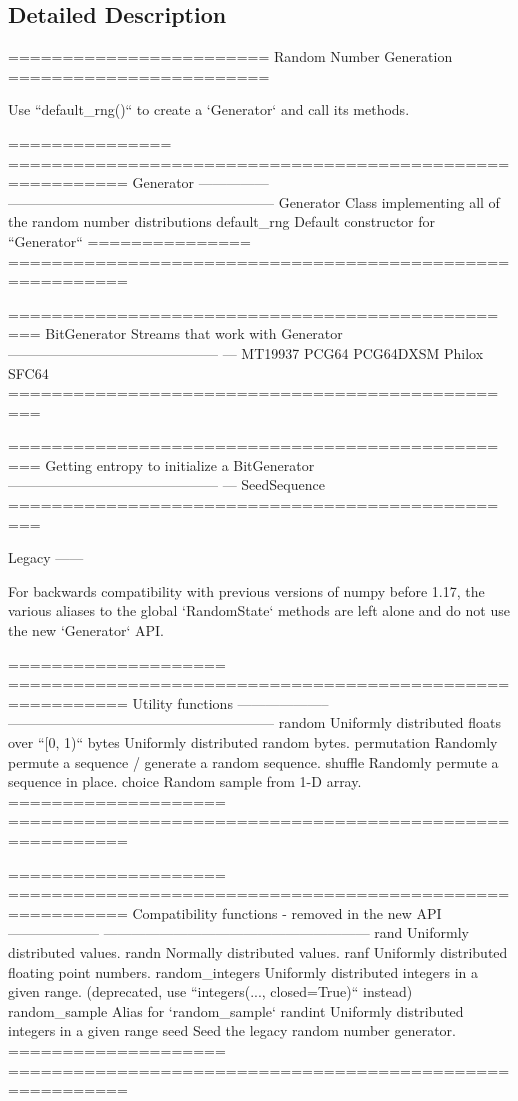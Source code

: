 \subsection{Detailed Description}
\begin{DoxyVerb}========================
Random Number Generation
========================

Use ``default_rng()`` to create a `Generator` and call its methods.

=============== =========================================================
Generator
--------------- ---------------------------------------------------------
Generator       Class implementing all of the random number distributions
default_rng     Default constructor for ``Generator``
=============== =========================================================

============================================= ===
BitGenerator Streams that work with Generator
--------------------------------------------- ---
MT19937
PCG64
PCG64DXSM
Philox
SFC64
============================================= ===

============================================= ===
Getting entropy to initialize a BitGenerator
--------------------------------------------- ---
SeedSequence
============================================= ===


Legacy
------

For backwards compatibility with previous versions of numpy before 1.17, the
various aliases to the global `RandomState` methods are left alone and do not
use the new `Generator` API.

==================== =========================================================
Utility functions
-------------------- ---------------------------------------------------------
random               Uniformly distributed floats over ``[0, 1)``
bytes                Uniformly distributed random bytes.
permutation          Randomly permute a sequence / generate a random sequence.
shuffle              Randomly permute a sequence in place.
choice               Random sample from 1-D array.
==================== =========================================================

==================== =========================================================
Compatibility
functions - removed
in the new API
-------------------- ---------------------------------------------------------
rand                 Uniformly distributed values.
randn                Normally distributed values.
ranf                 Uniformly distributed floating point numbers.
random_integers      Uniformly distributed integers in a given range.
         (deprecated, use ``integers(..., closed=True)`` instead)
random_sample        Alias for `random_sample`
randint              Uniformly distributed integers in a given range
seed                 Seed the legacy random number generator.
==================== =========================================================


\end{DoxyVerb}
